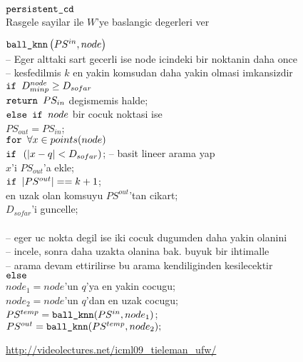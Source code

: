 \documentclass[12pt,fleqn]{article}\usepackage{../common}
\begin{document}
\begin{algorithm}[h]
\begin{pseudocode}
\codename $\mbox{\texttt{persistent\_cd}}$\\
\codeline Rasgele sayilar ile $W$'ye baslangic degerleri ver \\
\end{pseudocode}
\end{algorithm}




\begin{algorithm}[h]
\begin{pseudocode}
\codename $\mbox{\texttt{ball\_knn}}\left(PS^{in},node\right)$\\
\codeline -- Eger alttaki sart gecerli ise node icindeki bir noktanin daha once \\
\codeline -- kesfedilmis $k$ en yakin komsudan daha yakin olmasi imkansizdir\\
\codeline $\mbox{\texttt{if }} D^{node}_{minp} \ge D_{sofar}$ \\
\codeline \> $\mbox{\texttt{return }} PS_{in}$ degismemis halde;\\
\codeline $\mbox{\texttt{else if }} node $ bir cocuk noktasi ise \\
\codeline \> $PS_{out} = PS_{in}$;\\
\codeline \> $\mbox{\texttt{for }} \forall x \in points(node)$\\
\codeline \> \> $\mbox{\texttt{if }} \left( |x-q| < D_{sofar} \right)$; -- basit lineer arama yap\\
\codeline \> \> $x$'i $PS_{out}$'a ekle;\\
\codeline \> \> $\mbox{\texttt{if }} |PS^{out}| == k+1$;\\
\codeline \> \> \> en uzak olan komsuyu $PS^{out}$'tan cikart;\\
\codeline \> \> \> $D_{sofar}$'i guncelle;\\
\codeline \\
\codeline -- eger uc nokta degil ise iki cocuk dugumden daha yakin olanini \\
\codeline -- incele, sonra daha uzakta olanina bak. buyuk bir ihtimalle   \\
\codeline -- arama devam ettirilirse bu arama kendiliginden kesilecektir  \\
\codeline $\mbox{\texttt{else }}$\\
\codeline \> $node_1 = node$'un $q$'ya en yakin cocugu;\\
\codeline \> $node_2 = node$'un $q$'dan en uzak cocugu;\\
\codeline \> $PS^{temp} = \mbox{\texttt{ball\_knn}}(PS^{in},node_1)$;\\
\codeline \> $PS^{out} = \mbox{\texttt{ball\_knn}}(PS^{temp},node_2);$
\end{pseudocode}
\end{algorithm}





\url{http://videolectures.net/icml09_tieleman_ufw/}
\end{document}
